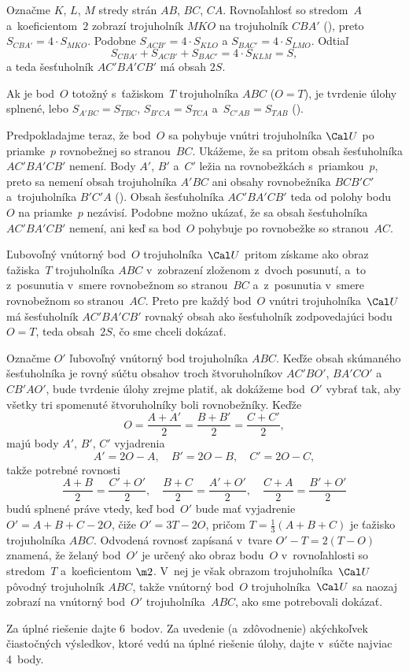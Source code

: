 {\ineriesenie
Označme $K$, $L$, $M$ stredy strán $AB$, $BC$, $CA$. Rovnoľahlosť so stredom~$A$ a~koeficientom~$2$ zobrazí trojuholník $MKO$ na trojuholník $CBA'$ (\obr), preto $S_{CBA'}=4\cdot S_{MKO}$. Podobne $S_{ACB'}=4\cdot S_{KLO}$ a $S_{BAC'}=4\cdot S_{LMO}$. Odtiaľ
$$
S_{CBA'}+S_{ACB'}+S_{BAC'}=4\cdot S_{KLM}=S,
$$
a teda šesťuholník $AC'BA'CB'$ má obsah $2S$.
\inspicture{}


\ineriesenie
Ak je bod~$O$ totožný s~ťažiskom~$T$ trojuholníka $ABC$ ($O=T$), je
tvrdenie úlohy splnené, lebo $S_{A'BC}=S_{TBC}$,
$S_{B'CA}=S_{TCA}$ a~$S_{C'AB}=S_{TAB}$ (\obr).


Predpokladajme teraz, že bod~$O$ sa pohybuje vnútri trojuholníka $\Cal U$ po priamke~$p$
rovnobežnej so stranou~$BC$. Ukážeme, že sa pritom
obsah šesťuholníka $AC'BA'CB'$ nemení.
Body $A'$, $B'$ a~$C'$ ležia na rovnobežkách s~priamkou~$p$, preto sa nemení obsah trojuholníka $A'BC$ ani obsahy rovnobežníka
$BCB'C'$ a~trojuholníka $B'C'A$ (\obr). Obsah šesťuholníka $AC'BA'CB'$
teda od polohy bodu~$O$ na priamke~$p$ nezávisí. Podobne možno ukázať, že sa obsah šesťuholníka
$AC'BA'CB'$ nemení, ani keď sa bod~$O$ pohybuje po rovnobežke so stranou~$AC$.
\twopictures

Ľubovoľný vnútorný bod~$O$ trojuholníka~$\Cal U$ pritom získame ako obraz
ťažiska~$T$ trojuholníka $ABC$ v~zobrazení zloženom
z~dvoch posunutí, a~to z~posunutia v~smere rovnobežnom so stranou~$BC$
a~z~posunutia v~smere rovnobežnom so stranou~$AC$.
Preto pre každý bod~$O$ vnútri trojuholníka~$\Cal U$ má šesťuholník
$AC'BA'CB'$ rovnaký obsah ako šesťuholník zodpovedajúci bodu $O=T$,
teda obsah~$2S$, čo sme chceli dokázať.

\ineriesenie
Označme $O'$ ľubovoľný vnútorný bod trojuholníka $ABC$. Keďže obsah
skúmaného šesťuholníka je rovný súčtu obsahov troch štvoruholníkov
$AC'BO'$, $BA'CO'$ a~$CB'AO'$, bude tvrdenie úlohy zrejme platiť, ak
dokážeme bod~$O'$ vybrať tak, aby všetky tri spomenuté
štvoruholníky boli rovnobežníky. Keďže
$$
O=\frac{A+A'}{2}=\frac{B+B'}{2}=\frac{C+C'}{2},
$$
majú body $A'$, $B'$, $C'$ vyjadrenia
$$
A'=2O-A,\quad B'=2O-B,\quad C'=2O-C,
$$
takže potrebné rovnosti
$$
\frac{A+B}{2}=\frac{C'+O'}{2},\quad
\frac{B+C}{2}=\frac{A'+O'}{2},\quad
\frac{C+A}{2}=\frac{B'+O'}{2}
$$
budú splnené práve vtedy, keď bod~$O'$ bude mať vyjadrenie
$O'=A+B+C-2O$, čiže $O'=3T-2O$, pričom $T=\frac13(A+B+C)$ je
ťažisko trojuholníka $ABC$. Odvodená rovnosť zapísaná v~tvare $O'-T=2(T-O)$
znamená, že želaný bod~$O'$ je určený ako obraz bodu~$O$ v~rovnoľahlosti
so stredom~$T$ a~koeficientom $\m2$. V~nej je však
obrazom trojuholníka~$\Cal U$ %
pôvodný trojuholník $ABC$, takže vnútorný bod~$O$ trojuholníka~$\Cal U$ sa
naozaj zobrazí na vnútorný bod~$O'$ trojuholníka~$ABC$, ako sme
potrebovali dokázať.


\nobreak\medskip\petit\noindent
Za úplné riešenie dajte 6~bodov.
Za uvedenie (a~zdôvodnenie) akýchkoľvek
čiastočných výsledkov, ktoré vedú na úplné riešenie úlohy,
dajte v~súčte najviac 4~body.
\endpetit
\bigbreak
}


